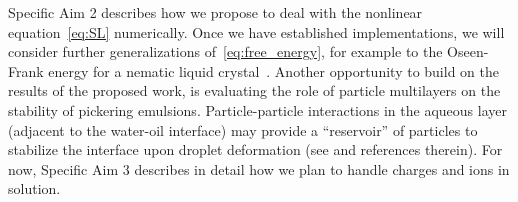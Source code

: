 
Specific Aim 2 describes how we propose to deal with the nonlinear
equation~\eqref{eq:SL} numerically. Once we have established
implementations, we will consider further generalizations
of~\eqref{eq:free_energy}, for example to the Oseen-Frank energy for a
nematic liquid crystal~\cite{doi:10.1137/15M103844X,
  Bartels,AIHPA_1997__66_4_411_0, deGennesProst,HaKiLi86,Virga}.
Another opportunity to build on the results of the proposed work,
is evaluating the role of particle multilayers on the stability of
pickering emulsions. Particle-particle interactions in the aqueous
layer (adjacent to the water-oil interface) may provide a
``reservoir'' of particles to stabilize the interface upon droplet deformation (see \cite{Bradley2016} and references therein).
For now,
Specific Aim 3 describes in detail how we plan to handle charges and
ions in solution.



